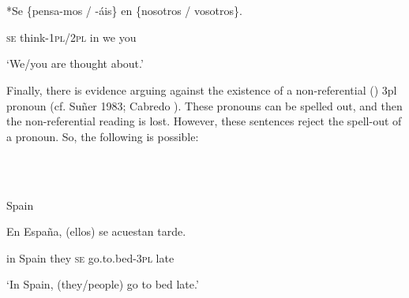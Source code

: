 \documentclass[output=paper]{langsci/langscibook}
\begin{document}
\begin{styleHTMLPreformatted}
\ea%
    \label{ex:key:38}
    \gll\\
        \\
    \glt
    \z

\end{styleHTMLPreformatted}

\begin{styleHTMLPreformatted}
*Se \{pensa-mos / -áis\}   en  \{nosotros / vosotros\}.      
\end{styleHTMLPreformatted}

\begin{styleHTMLPreformatted}
  \textsc{se}   think-\textsc{1pl/2pl}     in    we            you
\end{styleHTMLPreformatted}

\begin{styleHTMLPreformatted}
          ‘We/you are thought about.’
\end{styleHTMLPreformatted}

\begin{styleHTMLPreformatted}
Finally, there is evidence arguing against the existence of a non-referential () 3pl pronoun (cf. Suñer 1983; Cabredo \citealt{Hofherr2003}). These pronouns can be spelled out, and then the non-referential reading is lost. However, these sentences reject the spell-out of a pronoun. So, the following is possible:
\end{styleHTMLPreformatted}

\begin{styleHTMLPreformatted}
\ea%
    \label{ex:key:39}
    \gll\\
        \\
    \glt
    \z

           Spain
\end{styleHTMLPreformatted}

\begin{styleHTMLPreformatted}
En España, (ellos)  se  acuestan            tarde.    
\end{styleHTMLPreformatted}

\begin{styleHTMLPreformatted}
  in  Spain       they   \textsc{se} go.to.bed-\textsc{3pl}   late
\end{styleHTMLPreformatted}

\begin{styleHTMLPreformatted}
  ‘In Spain, (they/people) go to bed late.’
\end{styleHTMLPreformatted}
\end{document}

